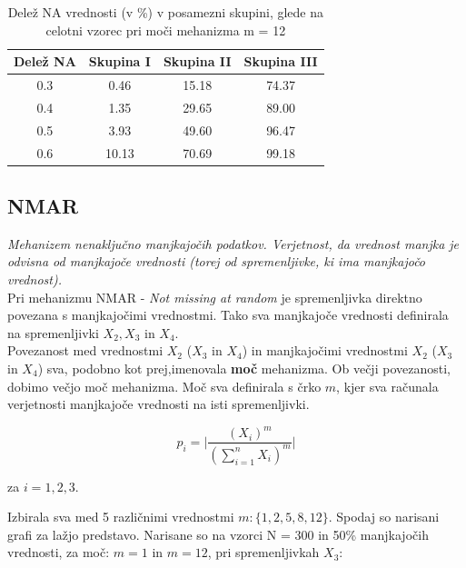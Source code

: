 \documentclass[12pt,a4paper]{article}
\begin{document}
	
\begin{table}[ht]
	\begin{tabular}{cccc}
		Delež NA & Skupina I & Skupina II  &  Skupina III  \\
		\hline
    0.3 & 0.46 & 15.18 & 74.37\\
    0.4 & 1.35 & 29.65 & 89.00\\
    0.5 & 3.93 & 49.60 & 96.47\\
    0.6 & 10.13 & 70.69 & 99.18\\
	\end{tabular}
	\caption{Delež NA vrednosti (v \%) v posamezni skupini, glede na celotni vzorec pri moči mehanizma m = 12}
	\label{tab:2}
\end{table}

\subsection{NMAR}

\textit{Mehanizem nenaključno manjkajočih podatkov. Verjetnost, da vrednost manjka je odvisna od manjkajoče vrednosti (torej od spremenljivke, ki ima manjkajočo vrednost).}
\\

\noindent Pri mehanizmu NMAR - \textit{Not missing at random} je spremenljivka direktno povezana s manjkajočimi vrednostmi. Tako sva manjkajoče vrednosti definirala na spremenljivki $X_2, X_3$ in $X_4$.
\\
\noindent Povezanost med vrednostmi $X_2$ ($X_3$ in $X_4$) in manjkajočimi vrednostmi $X_2$ ($X_3$ in $X_4$) sva, podobno kot prej,imenovala  \textbf{moč} mehanizma. Ob večji povezanosti, dobimo večjo moč mehanizma. Moč sva definirala s črko $m$, kjer sva računala verjetnosti manjkajoče vrednosti na isti spremenljivki.

$$p_i = \big| \frac{(X_i)^m}{(\sum_{i=1}^{n}X_i)^m} \big| $$

\noindent za $i = 1,2,3$.

\noindent Izbirala sva med 5 različnimi vrednostmi $m: \{1, 2, 5, 8, 12  \}$. Spodaj so narisani grafi za lažjo predstavo. Narisane so na vzorci N = 300 in 50\% manjkajočih vrednosti, za moč: $m = 1$  in $m= 12$, pri spremenljivkah $X_3$:

\pagebreak
\end{document}

